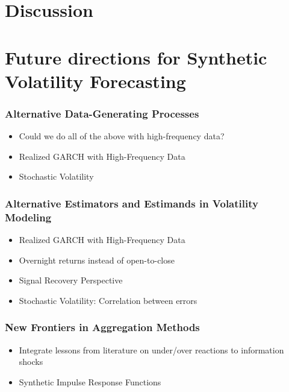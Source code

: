 \documentclass{beamer}
\theoremstyle{definition}
\begin{document}
\section{Discussion}

\section{Future directions for Synthetic Volatility Forecasting}

\begin{frame}
\frametitle{Alternative Data-Generating Processes}
\begin{itemize}

\item{Could we do all of the above with high-frequency data?}

\item{Realized GARCH with High-Frequency Data}

\item{Stochastic Volatility}
\end{itemize}
\end{frame}

\begin{frame}
    \frametitle{Alternative Estimators and Estimands in Volatility Modeling}
    \begin{itemize}
        \item{Realized GARCH with High-Frequency Data}
        
        \item{Overnight returns instead of open-to-close}
        
        \item{Signal Recovery Perspective}
        
        \item{Stochastic Volatility: Correlation between errors}
        
        \end{itemize}
\end{frame}
   
\begin{frame}
    \frametitle{New Frontiers in Aggregation Methods}
    \begin{itemize}
        \item Integrate lessons from literature on under/over reactions to information shocks \parencite[][]{jiang2017information}
        \item{Synthetic Impulse Response Functions}
        \end{itemize}
\end{frame}
\end{document}

